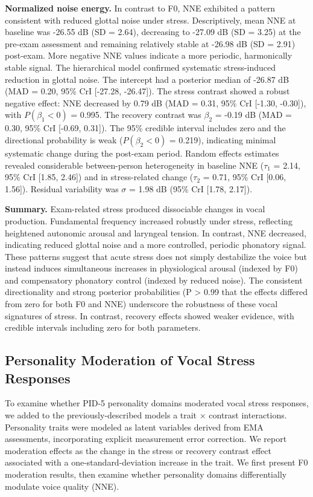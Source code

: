 \documentclass[
  english,
  man]{apa6}
\begin{document}
\textbf{Normalized noise energy.} In contrast to F0, NNE exhibited a pattern consistent with reduced glottal noise under stress. Descriptively, mean NNE at baseline was -26.55 dB (SD = 2.64), decreasing to -27.09 dB (SD = 3.25) at the pre-exam assessment and remaining relatively stable at -26.98 dB (SD = 2.91) post-exam. More negative NNE values indicate a more periodic, harmonically stable signal. The hierarchical model confirmed systematic stress-induced reduction in glottal noise. The intercept had a posterior median of -26.87 dB (MAD = 0.20, 95\% CrI {[}-27.28, -26.47{]}). The stress contrast showed a robust negative effect: NNE decreased by 0.79 dB (MAD = 0.31, 95\% CrI {[}-1.30, -0.30{]}), with \(P(\beta_1 < 0)\) = 0.995. The recovery contrast was \(\beta_2\) = -0.19 dB (MAD = 0.30, 95\% CrI {[}-0.69, 0.31{]}). The 95\% credible interval includes zero and the directional probability is weak (\(P(\beta_2 < 0)\) = 0.219), indicating minimal systematic change during the post-exam period. Random effects estimates revealed considerable between-person heterogeneity in baseline NNE (\(\tau_1\) = 2.14, 95\% CrI {[}1.85, 2.46{]}) and in stress-related change (\(\tau_2\) = 0.71, 95\% CrI {[}0.06, 1.56{]}). Residual variability was \(\sigma\) = 1.98 dB (95\% CrI {[}1.78, 2.17{]}).

\textbf{Summary.} Exam-related stress produced dissociable changes in vocal production. Fundamental frequency increased robustly under stress, reflecting heightened autonomic arousal and laryngeal tension. In contrast, NNE decreased, indicating reduced glottal noise and a more controlled, periodic phonatory signal. These patterns suggest that acute stress does not simply destabilize the voice but instead induces simultaneous increases in physiological arousal (indexed by F0) and compensatory phonatory control (indexed by reduced noise). The consistent directionality and strong posterior probabilities (P \textgreater{} 0.99 that the effects differed from zero for both F0 and NNE) underscore the robustness of these vocal signatures of stress. In contrast, recovery effects showed weaker evidence, with credible intervals including zero for both parameters.

\subsection{Personality Moderation of Vocal Stress Responses}\label{personality-moderation-of-vocal-stress-responses}

To examine whether PID-5 personality domains moderated vocal stress responses, we added to the previously-described models a trait × contrast interactions. Personality traits were modeled as latent variables derived from EMA assessments, incorporating explicit measurement error correction. We report moderation effects as the change in the stress or recovery contrast effect associated with a one-standard-deviation increase in the trait. We first present F0 moderation results, then examine whether personality domains differentially modulate voice quality (NNE).
\end{document}
